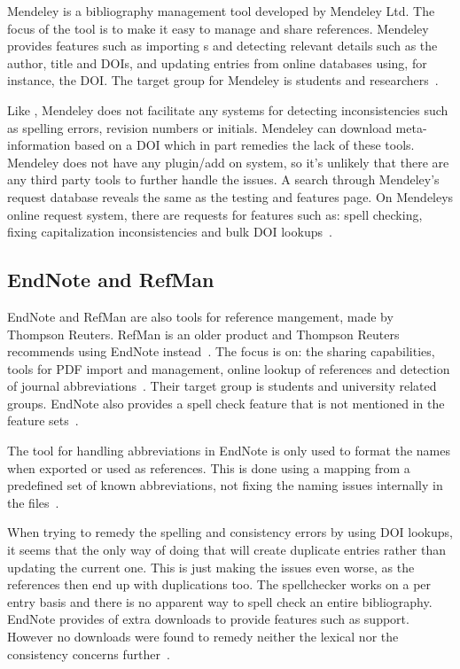 Mendeley is a bibliography management tool developed by Mendeley Ltd.
The focus of the tool is to make it easy to manage and share
references.  Mendeley provides features such as importing s
and detecting relevant details such as the author, title and DOIs, and
updating entries from online databases using, for instance, the DOI.
The target group for Mendeley is students and
researchers~\cite{mendeley_features}.

Like {\bibtex}, Mendeley does not facilitate any systems for detecting
inconsistencies such as spelling errors, revision numbers or initials.
Mendeley can download meta-information based on a DOI which in part
remedies the lack of these tools.  Mendeley does not have any
plugin/add on system, so it's unlikely that there are any third party
tools to further handle the {\bibtex} issues. A search through
Mendeley's request database reveals the same as the testing and
features page.  On Mendeleys online request system, there are requests
for features such as: spell checking, fixing capitalization
inconsistencies and bulk DOI lookups~\cite{mendeley_request_bulk_doi,
  mendeley_request_capitalization, mendeley_request_spellcheck,
  mendeley_request_lowercase}.

\subsection{EndNote and RefMan}
EndNote and RefMan are also tools for reference mangement, made by
Thompson Reuters.  RefMan is an older product and Thompson Reuters
recommends using EndNote instead~\cite{refman_switch,
  refman_features}.  The focus is on: the sharing capabilities, tools
for PDF import and management, online lookup of references and
detection of journal abbreviations~\cite{endnote_basic_features,
  endnote_x7_features}.  Their target group is students and university
related groups.  EndNote also provides a spell check feature that is
not mentioned in the feature sets~\cite{endnote_spellcheck}.

The tool for handling abbreviations in EndNote is only used to format
the names when exported or used as references.  This is done using a
mapping from a predefined set of known abbreviations, not fixing the
naming issues internally in the files~\cite{endnote_terms_journals}.

When trying to remedy the spelling and consistency errors by using DOI
lookups, it seems that the only way of doing that will create
duplicate entries rather than updating the current one. This is just
making the issues even worse, as the references then end up with
duplications too.  The spellchecker works on a per entry basis and
there is no apparent way to spell check an entire bibliography.
EndNote provides of extra downloads to provide features such as
{\bibtex} support.  However no downloads were found to remedy neither
the lexical nor the consistency concerns
further~\cite{endnote_downloads}.


